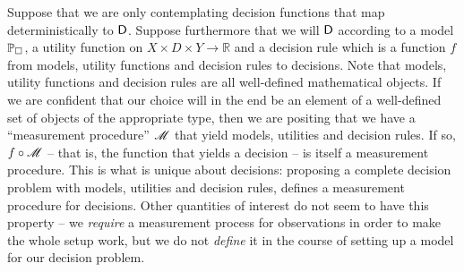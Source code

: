 Suppose that we are only contemplating decision functions that map deterministically to $\mathsf{D}$. Suppose furthermore that we will $\mathsf{D}$ according to a model $\mathbb{P}_\square$, a utility function on $X\times D\times Y\to \mathbb{R}$ and a decision rule which is a function $f$ from models, utility functions and decision rules to decisions. Note that models, utility functions and decision rules are all well-defined mathematical objects. If we are confident that our choice will in the end be an element of a well-defined set of objects of the appropriate type, then we are positing that we have a ``measurement procedure'' $\mathscr{M}$ that yield models, utilities and decision rules. If so, $f\circ \mathscr{M}$ -- that is, the function that yields a decision -- is itself a measurement procedure. This is what is unique about decisions: proposing a complete decision problem with models, utilities and decision rules, defines a measurement procedure for decisions. Other quantities of interest do not seem to have this property -- we \emph{require} a measurement process for observations in order to make the whole setup work, but we do not \emph{define} it in the course of setting up a model for our decision problem.





